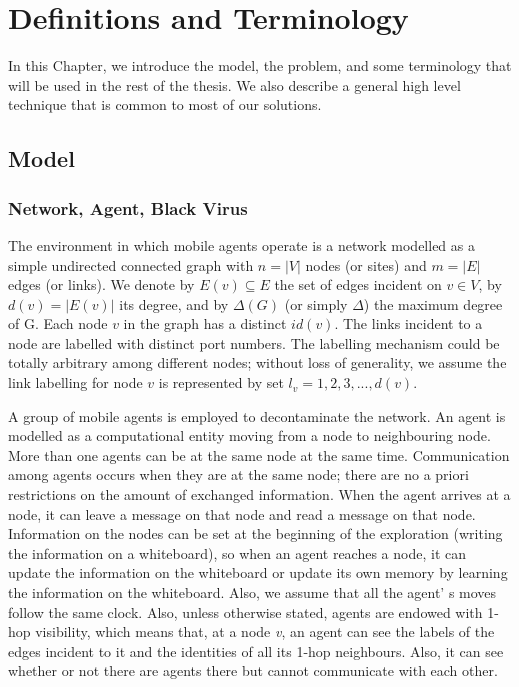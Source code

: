 \chapter {Definitions and Terminology}
\label{PM}
In this Chapter, we introduce the model, the problem, and some terminology that will be used in the rest of the thesis. We also  describe a general high level technique that is common to most of our solutions.

\section{Model}
\subsection{Network, Agent, Black Virus}

 The environment in which mobile agents operate is a network modelled as a simple undirected connected graph with $n = \left |V\right |$ nodes (or sites) and $m = \left |E\right |$ edges (or links). We denote by $E (v)\subseteq E$ the set of edges incident on $v\in V$, by $d (v) = \left|E (v)\right|$ its degree, and by $\Delta(G)$ (or simply $\Delta$) the maximum degree of G. Each node $v$ in the graph has a distinct $id(v)$. The links incident to a node are labelled with distinct port numbers. The labelling mechanism could be totally arbitrary among different nodes; without loss of generality, we assume the link labelling for node $v$ is represented by set $l_v =1,2,3,...,d(v)$. 

 A group of mobile agents is employed to decontaminate the network. An agent is modelled as a computational entity moving from a node to neighbouring node. More than one agents can be at the same node at the same time. Communication among agents occurs when they are at the same node; there are no a priori restrictions on the amount of exchanged information. When the agent arrives at a node, it can leave a message on that node and read a message on that node. Information on the nodes can be set  at the beginning of the exploration (writing the information on a whiteboard), so when an agent reaches a node, it can update the information on the whiteboard or update its own memory by learning the information on the whiteboard. \color{blue} Also, we assume that all the agent' s moves follow the same clock. \color{black} 
Also, unless otherwise stated, agents are endowed with 1-hop visibility, which means that, at a node {\em v}, an agent can see the labels of the edges incident to it and the identities of all its 1-hop neighbours. Also, it can   see whether or not there are agents there but cannot communicate with each other. 

